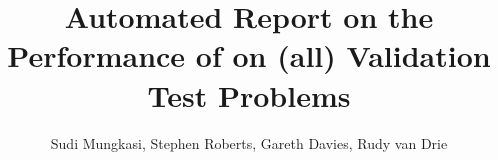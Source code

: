 \documentclass[11pt,a4paper]{report}
\begin{document}

\title{Automated Report on the Performance of \anuga{} on (all) Validation Test Problems}
\author{Sudi Mungkasi, Stephen Roberts, Gareth Davies, Rudy van Drie}    %
\maketitle
\tableofcontents






\end{document}
